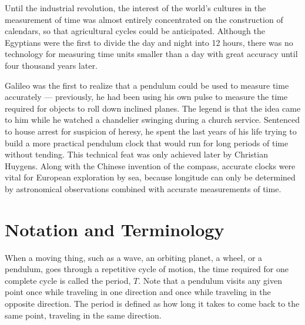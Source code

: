 \label{lab:pendulum}

\apparatus
{}


\introduction

Until the industrial revolution, the interest of the world's
cultures in the measurement of time was almost entirely
concentrated on the construction of calendars, so that
agricultural cycles could be anticipated.  Although the
Egyptians were the first to divide the day and night into 12
hours, there was no technology for measuring time units
smaller than a day with great accuracy until four thousand years later.

Galileo was the first to realize that a pendulum could be
used to measure time accurately --- previously, he had been
using his own pulse to measure the time required for objects
to roll down inclined planes.  The legend is that the idea
came to him while he watched a chandelier swinging during a
church service.  Sentenced to house arrest for suspicion of
heresy, he spent the last years of his life trying to build
a more practical pendulum clock that would run for long
periods of time without tending.  This technical feat was
only achieved later by Christian Huygens.  Along with the
Chinese invention of the compass, accurate clocks were vital
for European exploration by sea, because longitude can only
be determined by astronomical observations combined with
accurate measurements of time. 

\section*{Notation and Terminology}

When a moving thing, such as a wave, an orbiting planet, a
wheel, or a pendulum, goes through a repetitive cycle of
motion, the time required for one complete cycle is called
the period, $T$.  Note that a pendulum visits any given
point once while traveling in one direction and once while
traveling in the opposite direction.  The period is defined
as how long it takes to come back to the same point,
traveling in the same direction.

